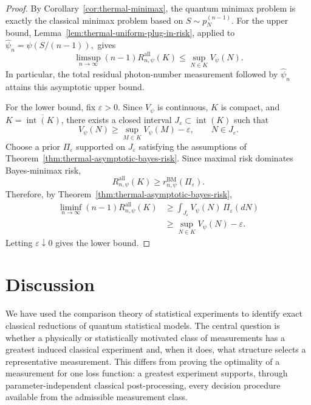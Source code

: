 \documentclass{article}
\theoremstyle{named}
\theoremstyle{named1}
\theoremstyle{plain}
\theoremstyle{remark}
\begin{document}
\begin{proof}
By Corollary~\ref{cor:thermal-minimax}, the quantum minimax problem is
exactly the classical minimax problem based on
$S\sim p_N^{(n-1)}.$
For the upper bound, Lemma~\ref{lem:thermal-uniform-plug-in-risk},
applied to
$\widehat\psi_n
    =
    \psi\!\left(S/(n-1)\right),
$
gives
\[
    \limsup_{n\to\infty}
    (n-1)R_{n,\psi}^{\mathrm{all}}(K)
    \leq
    \sup_{N\in K}V_\psi(N).
\]
In particular, the total residual photon-number measurement followed
by \(\widehat\psi_n\) attains this asymptotic upper bound.

For the lower bound, fix \(\varepsilon>0\). Since \(V_\psi\) is
continuous, \(K\) is compact, and
$K=\overline{\operatorname{int}(K)}$,
there exists a closed interval
\(J_\varepsilon\subset\operatorname{int}(K)\) such that
\[
    V_\psi(N)
    \geq
    \sup_{M\in K}V_\psi(M)-\varepsilon,
    \qquad N\in J_\varepsilon.
\]
Choose a prior \(\Pi_\varepsilon\) supported on \(J_\varepsilon\)
satisfying the assumptions of
Theorem~\ref{thm:thermal-asymptotic-bayes-risk}.
Since maximal risk dominates Bayes-minimax risk,
\[
    R_{n,\psi}^{\mathrm{all}}(K)
    \geq
    r_{n,\psi}^{\mathrm{BM}}(\Pi_\varepsilon).
\]
Therefore, by Theorem~\ref{thm:thermal-asymptotic-bayes-risk},
\[
\begin{aligned}
    \liminf_{n\to\infty}
    (n-1)R_{n,\psi}^{\mathrm{all}}(K)
    &\geq
    \int_{J_\varepsilon}
        V_\psi(N)\,
        \Pi_\varepsilon(dN)
    \\
    &\geq
    \sup_{N\in K}V_\psi(N)-\varepsilon.
\end{aligned}
\]
Letting \(\varepsilon\downarrow0\) gives the lower bound.
\end{proof}











\section{Discussion}
\label{sec:discussion}

We have used the comparison theory of statistical experiments to identify
exact classical reductions of quantum statistical models. The central
question is whether a physically or statistically motivated class of
measurements has a greatest induced classical experiment and, when it does,
what structure selects a representative measurement. This differs from
proving the optimality of a measurement for one loss function: a greatest
experiment supports, through parameter-independent classical
post-processing, every decision procedure available from the admissible
measurement class.
\end{document}

